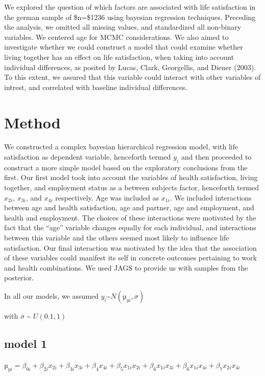 \documentclass[man]{apa6}
\theoremstyle{definition}
\theoremstyle{definition}
\theoremstyle{definition}
\theoremstyle{remark}
\begin{document}
We explored the question of which factors are associated with life
satisfaction in the german sample of \$n=\$1236 using bayesian
regression techniques. Preceding the analysis, we omitted all missing
values, and standardized all non-binary variables. We centered age for
MCMC considerations. We also aimed to investigate whether we could
construct a model that could examine whether living together has an
effect on life satisfaction, when taking into account individual
differences, as posited by Lucas, Clark, Georgellis, and Diener (2003).
To this extent, we assured that this variable could interact with other
variables of intrest, and correlated with baseline individual
differences.

\hypertarget{method}{%
\section{Method}\label{method}}

We constructed a complex bayesian hierarchical regression model, with
life satisfaction as dependent variable, henceforth termed \(y_{i}\) and
then proceeded to construct a more simple model based on the exploratory
conclusions from the first. Our first model took into account the
variables of health satisfaction, living together, and employment status
as a between subjects factor, henceforth termed \(x_{2i}\), \(x_{3i}\),
and \(x_{4i}\) respectively. Age was included as \(x_{1i}\). We included
interactions between age and health satisfaction, age and partner, age
and employment, and health and employment. The choices of these
interactions were motivated by the fact that the \enquote{age} variable
changes equally for each individual, and interactions between this
variable and the others seemed most likely to influence life
satisfaction. Our final interaction was motivated by the idea that the
association of these variables could manifest its self in concrete
outcomes pertaining to work and health combinations. We used JAGS to
provide us with samples from the posterior.

In all our models, we assumed
\({y_{i}}\)\textasciitilde{}\({N(µ_{yi},\sigma)}\)

with \(\sigma\) \textasciitilde{} \({U(0.1, 1)}\)

\hypertarget{model-1}{%
\subsection{model 1}\label{model-1}}

\({µ_{yi} = \beta_{0i} + \beta_{2i}x_{2i} + \beta_{3i}x_{3i} +\beta_{4}x_{4i} + \beta_{5}x_{1i}x_{2i} + \beta_{6}x_{1i}x_{3i} + \beta_{6}x_{1i}x_{4i}+\beta_{7}x_{2i}x_{4i} }\)
\end{document}
